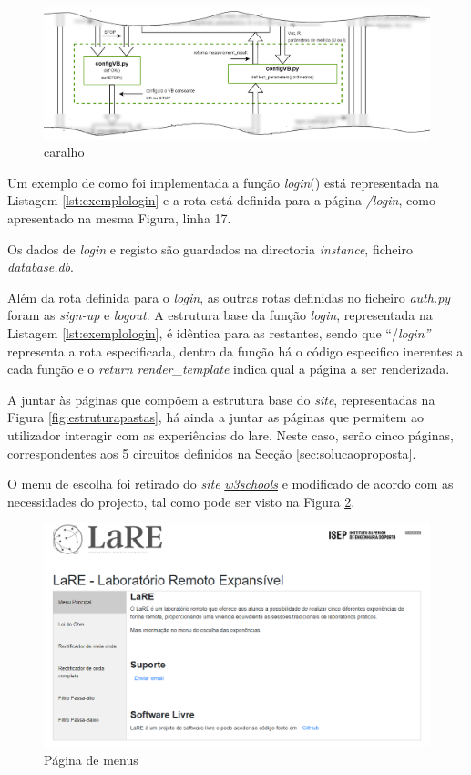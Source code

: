 \begin{figure}[hbtp]
	\centering
	\includegraphics[width=1\textwidth]{figures/ohm_diagramaCUT.drawio.png}
	\caption{caralho}
	\label{fig:diagramaCUT}
\end{figure}

Um exemplo de como foi implementada a função \textit{login}() está representada na Listagem \ref{lst:exemplologin} e a rota está definida para a página \textit{/login}, como apresentado na mesma Figura, linha 17.

Os dados de \textit{login} e registo são guardados na directoria \textit{instance}, ficheiro \textit{database.db}.

Além da rota definida para o \textit{login}, as outras rotas definidas no ficheiro \textit{auth.py} foram as \textit{sign-up} e \textit{logout}. A estrutura base da função \textit{login}, representada na Listagem \ref{lst:exemplologin}, é idêntica para as restantes, sendo que ``/\textit{login''} representa a rota especificada, dentro da função há o código especifico inerentes a cada função e o \textit{return render\_template} indica qual a página a ser renderizada.

A juntar às páginas que compõem a estrutura base do \textit{site}, representadas na Figura \ref{fig:estruturapastas}, há ainda a juntar as páginas que permitem ao utilizador interagir com as experiências do \acrshort{lare}. Neste caso, serão cinco páginas, correspondentes aos 5 circuitos definidos na Secção \ref{sec:solucaoproposta}.

O menu de escolha foi retirado do \textit{site} \href{https://www.w3schools.com/howto/howto_js_vertical_tabs.asp}{\textit{w3schools}} e modificado de acordo com as necessidades do projecto, tal como pode ser visto na Figura \ref{fig:pagmenu}.

\begin{figure}[hbtp]
	\centering
	\includegraphics[width=1\textwidth]{figures/menupage.png}
	\caption{Página de menus}
	\label{fig:pagmenu}
\end{figure}

